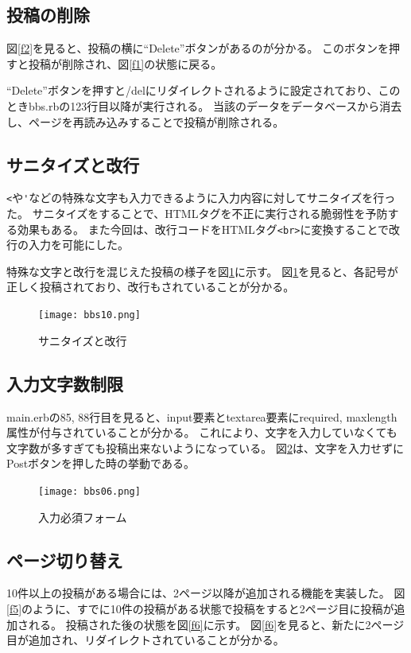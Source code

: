 \documentclass[a4j,titlepage]{jsarticle}
\begin{document}
\subsection{投稿の削除}
図\ref{f2}を見ると、投稿の横に``Delete''ボタンがあるのが分かる。
このボタンを押すと投稿が削除され、図\ref{f1}の状態に戻る。

``Delete''ボタンを押すと/delにリダイレクトされるように設定されており、このときbbs.rbの123行目以降が実行される。
当該のデータをデータベースから消去し、ページを再読み込みすることで投稿が削除される。

\subsection{サニタイズと改行}
\verb|<|や\verb|'|などの特殊な文字も入力できるように入力内容に対してサニタイズを行った。
サニタイズをすることで、HTMLタグを不正に実行される脆弱性を予防する効果もある。
また今回は、改行コードをHTMLタグ{\tt\verb|<br>|}に変換することで改行の入力を可能にした。

特殊な文字と改行を混じえた投稿の様子を図\ref{f3}に示す。
図\ref{f3}を見ると、各記号が正しく投稿されており、改行もされていることが分かる。

\begin{figure}[H]
  \centering
  \texttt{[image: bbs10.png]}
  \caption{サニタイズと改行}
  \label{f3}
\end{figure}

\subsection{入力文字数制限}
main.erbの85, 88行目を見ると、input要素とtextarea要素にrequired, maxlength属性が付与されていることが分かる。
これにより、文字を入力していなくても文字数が多すぎても投稿出来ないようになっている。
図\ref{f4}は、文字を入力せずにPostボタンを押した時の挙動である。

\begin{figure}[H]
  \centering
  \texttt{[image: bbs06.png]}
  \caption{入力必須フォーム}
  \label{f4}
\end{figure}

\subsection{ページ切り替え}
10件以上の投稿がある場合には、2ページ以降が追加される機能を実装した。
図\ref{f5}のように、すでに10件の投稿がある状態で投稿をすると2ページ目に投稿が追加される。
投稿された後の状態を図\ref{f6}に示す。
図\ref{f6}を見ると、新たに2ページ目が追加され、リダイレクトされていることが分かる。
\end{document}
